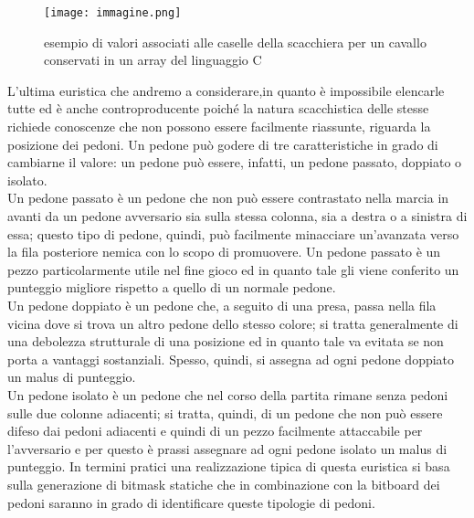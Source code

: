 \begin{figure}
    \centering
    \texttt{[image: immagine.png]}
    \caption{esempio di valori associati alle caselle della scacchiera per un cavallo conservati in un array del linguaggio C}
\end{figure}

L'ultima euristica che andremo a considerare,in quanto è impossibile elencarle tutte ed è anche controproducente poiché la natura scacchistica delle stesse richiede conoscenze che non possono essere facilmente riassunte,
riguarda la posizione dei pedoni. Un pedone può godere di tre caratteristiche in grado di cambiarne il valore: un pedone può essere, infatti, un pedone passato, doppiato o isolato.\\
Un pedone passato è un pedone che non può essere contrastato nella marcia in avanti da un pedone avversario sia sulla stessa colonna, sia a destra o a sinistra di essa; questo tipo di pedone, quindi, può facilmente 
minacciare un'avanzata verso la fila posteriore nemica con lo scopo di promuovere. Un pedone passato è un pezzo particolarmente utile nel fine gioco ed in quanto tale gli viene conferito un punteggio migliore
rispetto a quello di un normale pedone.\\ 
Un pedone doppiato è un pedone che, a seguito di una presa, passa nella fila vicina dove si trova un altro pedone dello stesso colore; si tratta generalmente di una debolezza strutturale di una posizione 
ed in quanto tale va evitata se non porta a vantaggi sostanziali. Spesso, quindi, si assegna ad ogni pedone doppiato un malus di punteggio.\\
Un pedone isolato è un pedone che nel corso della partita rimane senza pedoni sulle due colonne adiacenti; si tratta, quindi, di un pedone che non può essere difeso dai pedoni adiacenti e quindi di un pezzo
facilmente attaccabile per l'avversario e per questo è prassi assegnare ad ogni pedone isolato un malus di punteggio.
In termini pratici una realizzazione tipica di questa euristica si basa sulla generazione di bitmask statiche che in combinazione con la bitboard dei pedoni saranno in grado di identificare queste tipologie di pedoni.



